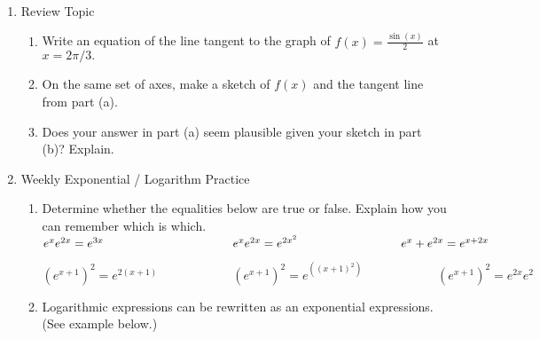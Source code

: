 \documentclass[11pt,fleqn]{article}
\begin{document}
\renewcommand{\headrulewidth}{0pt}
\newcommand{\blank}[1]{\rule{#1}{0.75pt}}
\newcommand{\bc}{\begin{center}}
\newcommand{\ec}{\end{center}}
\renewcommand{\d}{\displaystyle}

\vspace*{-0.7in}

\begin{center}
  \large
  \\ \vfill
\end{center}
\vspace*{-1.5in}
\begin{enumerate}
\item Review Topic
	\begin{enumerate}
	\item Write an equation of the line tangent to the graph of $f(x)=\frac{\sin(x)}{2}$ at $x=2 \pi /3.$ 
	\vspace{1in}
	\item On the same set of axes, make a sketch of $f(x)$ and the tangent line from part (a). 
	\vfill
	\item Does your answer in part (a) seem plausible given your sketch in part (b)? Explain.
	\vspace{0.5in}
	\end{enumerate}

\item Weekly Exponential / Logarithm Practice\\
	\begin{enumerate}
	\item Determine whether the equalities below are true or false. Explain how you can remember which is which.\\
	
	$ e^x e^{2x}=e^{3x} \hspace{1.5in} e^xe^{2x}=e^{2x^2}\hspace{1.2in} e^x+e^{2x}=e^{x+2x}$
	
	\vfill
	$(e^{x+1})^2=e^{2(x+1)} \hspace{1in} (e^{x+1})^2=e^{((x+1)^2)} \hspace{1in} (e^{x+1})^2=e^{2x}e^2$ 
	\vfill
	
\newpage
	\item Logarithmic expressions can be rewritten as an exponential expressions. (See example below.)\\
	

\end{enumerate}
\end{enumerate}
\end{document}

